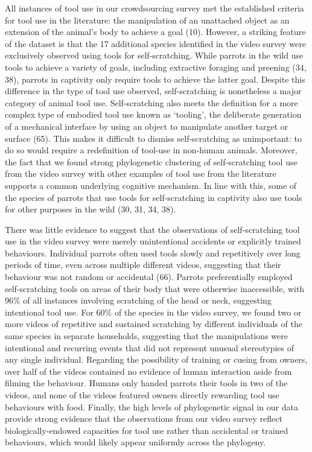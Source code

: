 \documentclass[
  man,floatsintext]{apa6}
\begin{document}
All instances of tool use in our crowdsourcing survey met the established
criteria for tool use in the literature: the manipulation of an unattached
object as an extension of the animal's body to achieve a goal (10).
However, a striking feature of the dataset is that the 17 additional species
identified in the video survey were exclusively observed using tools for
self-scratching. While parrots in the wild use tools to achieve a variety of
goals, including extractive foraging and preening (34, 38),
parrots in captivity only require tools to achieve the latter goal. Despite this
difference in the type of tool use observed, self-scratching is nonetheless a
major category of animal tool use. Self-scratching also meets the definition for
a more complex type of embodied tool use known as `tooling', the deliberate
generation of a mechanical interface by using an object to manipulate another
target or surface (65). This makes it difficult to dismiss
self-scratching as unimportant: to do so would require a redefinition of
tool-use in non-human animals. Moreover, the fact that we found strong
phylogenetic clustering of self-scratching tool use from the video survey with
other examples of tool use from the literature supports a common underlying
cognitive mechanism. In line with this, some of the species of parrots that use
tools for self-scratching in captivity also use tools for other purposes in the
wild (30, 31, 34, 38).

There was little evidence to suggest that the observations of self-scratching
tool use in the video survey were merely unintentional accidents or explicitly
trained behaviours. Individual parrots often used tools slowly and repetitively
over long periods of time, even across multiple different videos, suggesting
that their behaviour was not random or accidental (66). Parrots
preferentially employed self-scratching tools on areas of their body that were
otherwise inaccessible, with 96\% of all instances involving scratching of the
head or neck, suggesting intentional tool use. For 60\% of the species in the
video survey, we found two or more videos of repetitive and sustained scratching
by different individuals of the same species in separate households, suggesting
that the manipulations were intentional and recurring events that did not
represent unusual stereotypies of any single individual. Regarding the
possibility of training or cueing from owners, over half of the videos contained
no evidence of human interaction aside from filming the behaviour. Humans only
handed parrots their tools in two of the videos, and none of the videos featured
owners directly rewarding tool use behaviours with food. Finally, the high
levels of phylogenetic signal in our data provide strong evidence that the
observations from our video survey reflect biologically-endowed capacities for
tool use rather than accidental or trained behaviours, which would likely appear
uniformly across the phylogeny.
\end{document}

